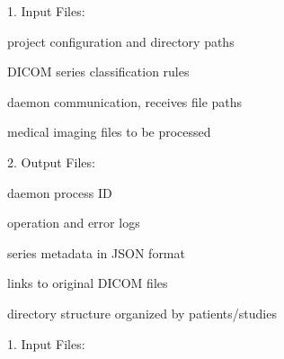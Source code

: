 \documentclass[letterpaper,10pt,english]{sphinxmanual}
\begin{document}
\begin{DUlineblock}{0em}
\item[] 1. Input Files:
\end{DUlineblock}

\begin{DUlineblock}{0em}
\item[] \sphinxhyphen{}  \sphinxhyphen{} project configuration and directory paths
\item[] \sphinxhyphen{}  \sphinxhyphen{} DICOM series classification rules
\item[] \sphinxhyphen{}  \sphinxhyphen{} daemon communication, receives file paths
\item[] \sphinxhyphen{}  \sphinxhyphen{} medical imaging files to be processed
\end{DUlineblock}

\begin{DUlineblock}{0em}
\item[] 2. Output Files:
\end{DUlineblock}

\begin{DUlineblock}{0em}
\item[] \sphinxhyphen{}  \sphinxhyphen{} daemon process ID
\item[] \sphinxhyphen{}  \sphinxhyphen{} operation and error logs
\item[] \sphinxhyphen{}  \sphinxhyphen{} series metadata in JSON format
\item[] \sphinxhyphen{}  \sphinxhyphen{} links to original DICOM files
\item[] \sphinxhyphen{}  \sphinxhyphen{} directory structure organized by patients/studies
\end{DUlineblock}

\sphinxAtStartPar
{}


\sphinxAtStartPar
{}

\begin{DUlineblock}{0em}
\item[] 1. Input Files:
\end{DUlineblock}
\end{document}

